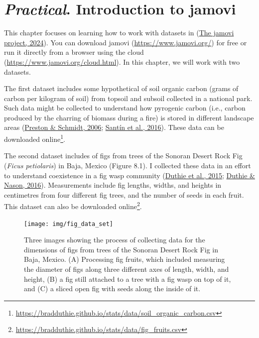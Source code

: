 \documentclass[
  openany]{krantz}
\begin{document}
\hypertarget{Chapter_8}{%
\chapter{\texorpdfstring{\emph{Practical}. Introduction to jamovi}{Practical. Introduction to jamovi}}\label{Chapter_8}}

This chapter focuses on learning how to work with datasets in  (\protect\hyperlink{ref-Jamovi2022}{The jamovi project, 2024}).
You can download jamovi (\url{https://www.jamovi.org/}) for free or run it directly from a browser using the  cloud (\url{https://www.jamovi.org/cloud.html}).
In this chapter, we will work with two datasets.

The first dataset includes some hypothetical  of soil organic carbon (grams of carbon per kilogram of soil) from topsoil and subsoil collected in a national park.
Such data might be collected to understand how pyrogenic carbon (i.e., carbon produced by the charring of biomass during a fire) is stored in different landscape areas (\protect\hyperlink{ref-Preston2006}{Preston \& Schmidt, 2006}; \protect\hyperlink{ref-Santin2016}{Santín et al., 2016}).
These data can be downloaded online\footnote{\url{https://bradduthie.github.io/stats/data/soil_organic_carbon.csv}}.

The second dataset includes  of figs from trees of the Sonoran Desert Rock Fig (\emph{Ficus petiolaris}) in Baja, Mexico (Figure 8.1).
I collected these data in an effort to understand coexistence in a fig wasp community (\protect\hyperlink{ref-Duthie2015b}{Duthie et al., 2015}; \protect\hyperlink{ref-Duthie2016}{Duthie \& Nason, 2016}).
Measurements include fig lengths, widths, and heights in centimetres from four different fig trees, and the number of seeds in each fruit.
This dataset can also be downloaded online\footnote{\url{https://bradduthie.github.io/stats/data/fig_fruits.csv}}.

\begin{figure}
\texttt{[image: img/fig\_data\_set]} \caption{Three images showing the process of collecting data for the dimensions of figs from trees of the Sonoran Desert Rock Fig in Baja, Mexico. (A) Processing fig fruits, which included measuring the diameter of figs along three different axes of length, width, and height, (B) a fig still attached to a tree with a fig wasp on top of it, and (C) a sliced open fig with seeds along the inside of it.}\label{fig:unnamed-chunk-24}
\end{figure}
\end{document}

